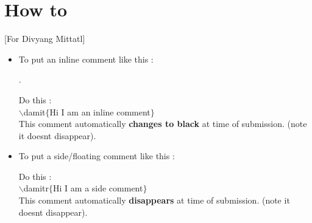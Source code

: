 \section*{How to}[For Divyang Mittatl]
\begin{itemize}
    \item 

 To put an inline comment like this :

.

Do this : \\
$\backslash$damit$\{$Hi I am an inline comment$\}$\\
This comment automatically \textbf{changes to black} at time of submission. (note it doesnt disappear).

\item 
To put a side/floating comment like this :

Do this : \\
$\backslash$damitr$\{$Hi I am a side comment$\}$\\
This comment automatically \textbf{disappears} at time of submission. (note it doesnt disappear).

\end{itemize}

